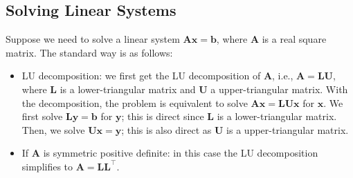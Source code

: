         
        
\subsection{Solving Linear Systems}
    Suppose we need to solve a linear system $\bm{A} \bm{x} = \bm{b}$, where $\bm{A}$ is a real square matrix.
    The standard way is as follows:
        \begin{itemize}
            \item LU decomposition: we first get the LU decomposition of $\bm{A}$, i.e., $\bm{A} = \bm{L} \bm{U}$, where $\bm{L}$ is a lower-triangular matrix and $\bm{U}$ a upper-triangular matrix.
            With the decomposition, the problem is equivalent to solve $\bm{A} \bm{x} = \bm{L} \bm{U} \bm{x}$ for $\bm{x}$.
            We first solve $\bm{L} \bm{y} = \bm{b}$ for $\bm{y}$; this is direct since $\bm{L}$ is a lower-triangular matrix.
            Then, we solve $\bm{U} \bm{x} = \bm{y}$; this is also direct as $\bm{U}$ is a upper-triangular matrix.
            \item If $\bm{A}$ is symmetric positive definite: in this case the LU decomposition simplifies to $\bm{A} = \bm{L} \bm{L}^\top$.
        \end{itemize}
        

